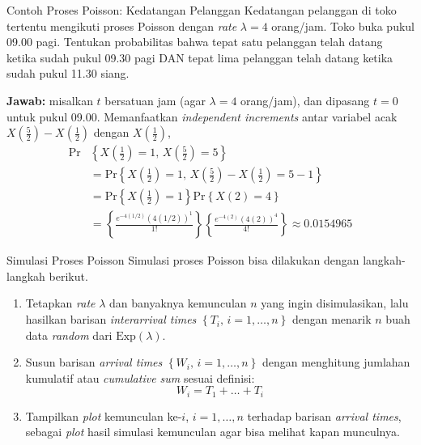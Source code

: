 \documentclass{beamer}
\newcommand{\pars}[1]{\left(#1\right)}
\newcommand{\braces}[1]{\left\{#1\right\}}
\begin{document}
\begin{frame}{Contoh Proses Poisson: Kedatangan Pelanggan}
    Kedatangan pelanggan di toko tertentu mengikuti proses Poisson dengan \textit{rate} \(\lambda = 4\) orang/jam. Toko buka pukul 09.00 pagi. Tentukan probabilitas bahwa tepat satu pelanggan telah datang ketika sudah pukul 09.30 pagi DAN tepat lima pelanggan telah datang ketika sudah pukul 11.30 siang.

    \textbf{Jawab:} misalkan \(t\) bersatuan jam (agar \(\lambda = 4\) orang/jam), dan dipasang \(t=0\) untuk pukul 09.00. Memanfaatkan \textit{independent increments} antar variabel acak \(X\pars{\frac{5}{2}} - X\pars{\frac{1}{2}}\) dengan \(X\pars{\frac{1}{2}}\),
    \begin{align*}
        \text{Pr}&\braces{X\pars{\frac{1}{2}} = 1, \, X\pars{\frac{5}{2}} = 5} \\
        &= \text{Pr}\braces{X\pars{\frac{1}{2}} = 1, \, X\pars{\frac{5}{2}} - X\pars{\frac{1}{2}} = 5-1} \\
        &= \text{Pr}\braces{X\pars{\frac{1}{2}} = 1} \text{Pr}\braces{X\pars{2} = 4} \\
        &= \braces{ \frac{e^{-4(1/2)} \pars{4(1/2)}^1}{1!} }\braces{ \frac{e^{-4(2)} \pars{4(2)}^4}{4!} }
        \approx 0.0154965
    \end{align*}
\end{frame}

\begin{frame}{Simulasi Proses Poisson}
    Simulasi proses Poisson bisa dilakukan dengan langkah-langkah berikut.
    \begin{enumerate}
        \item Tetapkan \textit{rate} \(\lambda\) dan banyaknya kemunculan \(n\) yang ingin disimulasikan, lalu hasilkan barisan \textit{interarrival times} \(\braces{T_i, \, i = 1, \dots, n}\) dengan menarik \(n\) buah data \textit{random} dari \(\text{Exp}(\lambda)\).
        \item Susun barisan \textit{arrival times} \(\braces{W_i, \, i = 1, \dots, n}\) dengan menghitung jumlahan kumulatif atau \textit{cumulative sum} sesuai definisi:
        \[W_i = T_1 + \dots + T_i\]
        \item Tampilkan \textit{plot} kemunculan ke-\(i\), \( i = 1, \dots, n \) terhadap barisan \textit{arrival times}, sebagai \textit{plot} hasil simulasi kemunculan agar bisa melihat kapan munculnya.
    \end{enumerate}
\end{frame}
\end{document}
